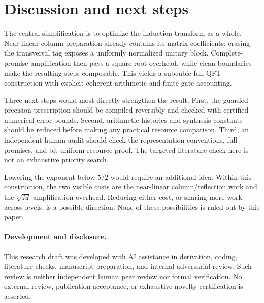 \documentclass[11pt]{article}
\theoremstyle{definition}
\begin{document}
\section{Discussion and next steps}\label{sec:discussion}

The central simplification is to optimize the induction transform as a
whole. Near-linear column preparation already contains its matrix
coefficients; erasing the transversal tag exposes a uniformly normalized
unitary block. Complete-promise amplification then pays a square-root
overhead, while clean boundaries make the resulting steps composable.
This yields a subcubic full-QFT construction with explicit coherent
arithmetic and finite-gate accounting.

Three next steps would most directly strengthen the result.
First, the guarded precision prescription should be compiled reversibly
and checked with certified numerical error bounds. Second, arithmetic
histories and synthesis constants should be reduced before making any
practical resource comparison. Third, an independent human audit should
check the representation conventions, full promises, and bit-uniform
resource proof. The targeted literature check here is not an exhaustive
priority search.

Lowering the exponent below $5/2$ would require an additional idea.
Within this construction, the two visible costs are the near-linear
column/reflection work and the $\sqrt M$ amplification overhead.
Reducing either cost, or sharing more work across levels, is a possible
direction. None of these possibilities is ruled out by this paper.

\paragraph{Development and disclosure.}
This research draft was developed with AI assistance in derivation,
coding, literature checks, manuscript preparation, and internal adversarial
review. Such review is neither independent human peer review nor formal
verification. No external review, publication acceptance, or exhaustive
novelty certification is asserted.
\end{document}
